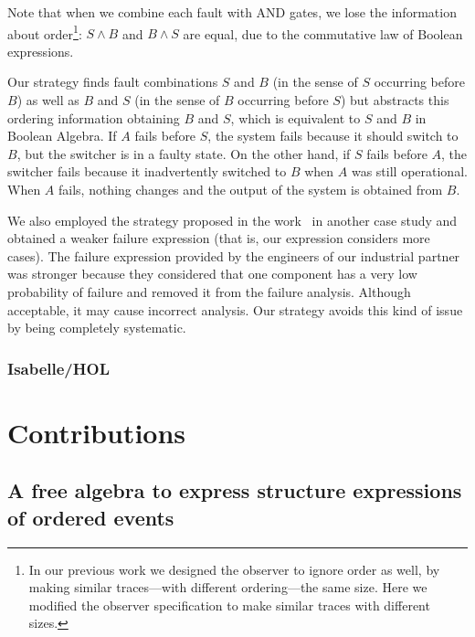 \documentclass[12pt,openright,twoside,a4paper,oldfontcommands,english,brazil,draft]{abntex2}
\theoremstyle{theo}
\begin{document}
Note that when we combine each fault with \ac{AND} gates, we lose the information about order\footnote{In our previous work we designed the observer to ignore order as well, by making similar traces---with different ordering---the same size. Here we modified the observer specification to make similar traces with different sizes.}: $S \land B$ and $B \land S$ are equal, due to the commutative law of Boolean expressions.

Our strategy finds fault combinations $S$ and $B$ (in the sense of $S$ occurring before $B$) as well as $B$ and $S$ (in the sense of $B$ occurring before $S$) but abstracts this ordering information obtaining $B$ and $S$, which is equivalent to $S$ and $B$ in Boolean Algebra.
%
If $A$ fails before $S$, the system fails because it should switch to $B$, but the switcher is in a faulty state.
%
On the other hand, if $S$ fails before $A$, the switcher fails because it inadvertently switched to $B$ when $A$ was still operational.
%
When $A$ fails, nothing changes and the output of the system is obtained from $B$.

We also employed the strategy proposed in the work~\cite{DM2012} in another case study and obtained a weaker failure expression (that is, our expression considers more cases).
The failure expression provided by the engineers of our industrial partner was stronger because they considered that one component has a very low probability of failure and removed it from the failure analysis.
Although acceptable, it may cause incorrect analysis.
Our strategy avoids this kind of issue by being completely systematic.

\section{Isabelle/HOL}
\label{sec:isabelle}



\part{Contributions}
\label{part:contributions}


\chapter{A free algebra to express structure expressions of ordered events}
\label{sec:strategy}
\end{document}

